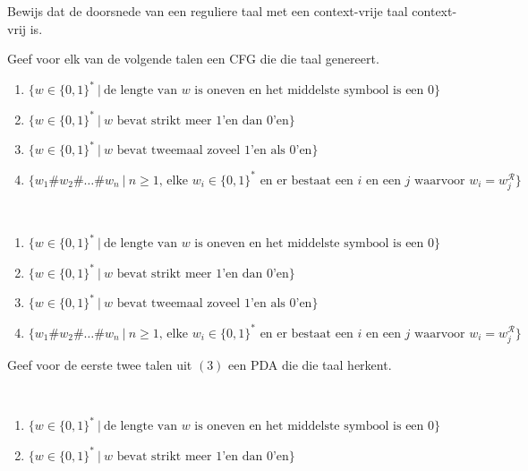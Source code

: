 \documentclass[a4paper]{article}
\begin{document}
\begin{question}
Bewijs dat de doorsnede van een reguliere taal met een context-vrije taal context-vrij is.
\end{question}

\begin{question}
Geef voor elk van de volgende talen een CFG die die taal genereert.
\begin{enumerate}
 \item $\{ w \in \{0,1\}^* \ | \ \text{de lengte van $w$ is oneven en het middelste symbool is een $0$} \}$
 \item $\{ w \in \{0,1\}^* \ | \ \text{$w$ bevat strikt meer $1$'en dan $0$'en} \}$
 \item $\{ w \in \{0,1\}^* \ | \ \text{$w$ bevat tweemaal zoveel $1$'en als $0$'en} \}$
 \item $\{ w_1 \# w_2 \# \ldots \# w_n \ | \ \text{$n \geq 1$, elke $w_i \in \{0,1\}^*$ en er bestaat een $i$ en een $j$ waarvoor $w_i = w_j^\mathcal{R}$} \}$
\end{enumerate}

\begin{answer}~~
\begin{enumerate}
 \item $\{ w \in \{0,1\}^* \ | \ \text{de lengte van $w$ is oneven en het middelste symbool is een $0$} \}$
 \item $\{ w \in \{0,1\}^* \ | \ \text{$w$ bevat strikt meer $1$'en dan $0$'en} \}$
 \item $\{ w \in \{0,1\}^* \ | \ \text{$w$ bevat tweemaal zoveel $1$'en als $0$'en} \}$
 \item $\{ w_1 \# w_2 \# \ldots \# w_n \ | \ \text{$n \geq 1$, elke $w_i \in \{0,1\}^*$ en er bestaat een $i$ en een $j$ waarvoor $w_i = w_j^\mathcal{R}$} \}$
\end{enumerate}
\end{answer}
\end{question}

\begin{question}
Geef voor de eerste twee talen uit $(3)$ een PDA die die taal herkent.

\begin{answer}~~
\begin{enumerate}
 \item $\{ w \in \{0,1\}^* \ | \ \text{de lengte van $w$ is oneven en het middelste symbool is een $0$} \}$
 \item $\{ w \in \{0,1\}^* \ | \ \text{$w$ bevat strikt meer $1$'en dan $0$'en} \}$
\end{enumerate}
\end{answer}
\end{question}
\end{document}
